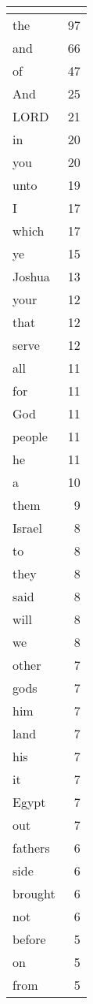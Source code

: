 \begin{center}
\begin{longtable}{l|r}
\hline \multicolumn{2}{c}{{ }} \\ \hline
\endfoot 
the & 97\\ \hline 
and & 66\\ \hline 
of & 47\\ \hline 
And & 25\\ \hline 
LORD & 21\\ \hline 
in & 20\\ \hline 
you & 20\\ \hline 
unto & 19\\ \hline 
I & 17\\ \hline 
which & 17\\ \hline 
ye & 15\\ \hline 
Joshua & 13\\ \hline 
your & 12\\ \hline 
that & 12\\ \hline 
serve & 12\\ \hline 
all & 11\\ \hline 
for & 11\\ \hline 
God & 11\\ \hline 
people & 11\\ \hline 
he & 11\\ \hline 
a & 10\\ \hline 
them & 9\\ \hline 
Israel & 8\\ \hline 
to & 8\\ \hline 
they & 8\\ \hline 
said & 8\\ \hline 
will & 8\\ \hline 
we & 8\\ \hline 
other & 7\\ \hline 
gods & 7\\ \hline 
him & 7\\ \hline 
land & 7\\ \hline 
his & 7\\ \hline 
it & 7\\ \hline 
Egypt & 7\\ \hline 
out & 7\\ \hline 
fathers & 6\\ \hline 
side & 6\\ \hline 
brought & 6\\ \hline 
not & 6\\ \hline 
before & 5\\ \hline 
on & 5\\ \hline 
from & 5\\ \hline 

\end{longtable}
\end{center}
